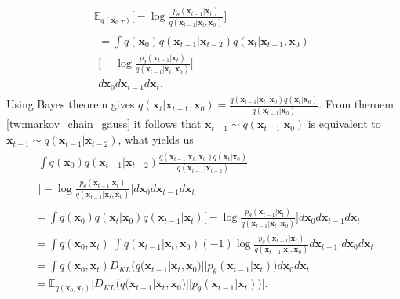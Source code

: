 \documentclass[10pt]{article}
\begin{document}
\begin{gather}
\mathbb{E}_{q(\textbf{x}_{0:T})}  
    \Bigg[ -\log
    \frac{ p_{\theta}( \textbf{x}_{t-1}|  \textbf{x}_{t }  )   }
    { q( \textbf{x}_{t-1}|  \textbf{x}_{t},  \textbf{x}_{0}  )}\Bigg] \\
    \begin{gathered}
    = \int q(\textbf{x}_{0})q(\textbf{x}_{t-1}|\textbf{x}_{t-2})q(\textbf{x}_{t}|\textbf{x}_{t-1}, \textbf{x}_{0})
   \\ \Bigg[ -\log \frac{ p_{\theta}( \textbf{x}_{t-1}|  \textbf{x}_{t }  )   }
    { q( \textbf{x}_{t-1}|  \textbf{x}_{t},  \textbf{x}_{0}  )}\Bigg] \\
    d \textbf{x}_{0} d \textbf{x}_{t-1} d \textbf{x}_{t}. 
    \end{gathered}
\end{gather}
Using Bayes theorem gives  $q(\textbf{x}_{t}|\textbf{x}_{t-1}, \textbf{x}_{0}) = \frac{ q( \textbf{x}_{t-1}|  \textbf{x}_{t}, \textbf{x}_{0}) q( \textbf{x}_{t}| \textbf{x}_{0})}
    {q( \textbf{x}_{t-1}| \textbf{x}_{0})}
    $. From theroem \ref{tw:markov_chain_gauss} it follows that $\textbf{x}_{t-1} \sim  q(\textbf{x}_{t-1}| \textbf{x}_{0} ) $ is equivalent to
$\textbf{x}_{t-1} \sim  q(\textbf{x}_{t-1}| \textbf{x}_{t-2} ) $, what yields us
\begin{gather}
    \begin{gathered}
\int q(\textbf{x}_{0})q(\textbf{x}_{t-1}|\textbf{x}_{t-2})
\frac{ q( \textbf{x}_{t-1}|  \textbf{x}_{t}, \textbf{x}_{0}) q( \textbf{x}_{t}| \textbf{x}_{0})}
    {q( \textbf{x}_{t-1}| \textbf{x}_{t-2})}\\
    \Bigg[  -\log \frac{ p_{\theta}( \textbf{x}_{t-1}|  \textbf{x}_{t }  )   }
    { q( \textbf{x}_{t-1}|  \textbf{x}_{t},  \textbf{x}_{0}  )}\Bigg] 
    d \textbf{x}_{0} d \textbf{x}_{t-1} d \textbf{x}_{t} 
        \end{gathered}\\
    = \int q(\textbf{x}_{0})q( \textbf{x}_{t}| \textbf{x}_{0})q( \textbf{x}_{t-1}|  \textbf{x}_{t})
      \Bigg[ -\log \frac{ p_{\theta}( \textbf{x}_{t-1}|  \textbf{x}_{t }  )   }
    { q( \textbf{x}_{t-1}|  \textbf{x}_{t},  \textbf{x}_{0}  )}\Bigg] 
    d \textbf{x}_{0} d \textbf{x}_{t-1} d \textbf{x}_{t} \\
    =\int  q(\textbf{x}_{0}, \textbf{x}_{t})  \Bigg[\int q( \textbf{x}_{t-1}|  \textbf{x}_{t},  \textbf{x}_{0})
        (-1)\log \frac{ p_{\theta}( \textbf{x}_{t-1}|  \textbf{x}_{t }  )   }
    { q( \textbf{x}_{t-1}|  \textbf{x}_{t},  \textbf{x}_{0}  )}
    d \textbf{x}_{t-1} \Bigg] d \textbf{x}_{0}d \textbf{x}_{t} \\
    = \int  q(\textbf{x}_{0}, \textbf{x}_{t}) 
    D_{KL}\big( q( \textbf{x}_{t-1}|  \textbf{x}_{t},  \textbf{x}_{0})||
    p_{\theta}( \textbf{x}_{t-1} | \textbf{x}_{t} ) \big)
    d \textbf{x}_{0}d \textbf{x}_{t} \\
    =\label{eq:dkl_loss}
    \mathbb{E}_{q(\textbf{x}_{0}, \textbf{x}_{t})}  \Bigg[
    D_{KL}\big( q( \textbf{x}_{t-1}|  \textbf{x}_{t},  \textbf{x}_{0})||
    p_{\theta}( \textbf{x}_{t-1} | \textbf{x}_{t} ) \big)
    \Bigg].
\end{gather}
\end{document}
